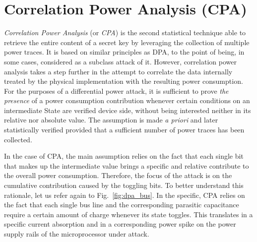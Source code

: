             \begin{table}[]
                \centering
                \caption{The secret key to used for this thesis work.}
                \label{tab:key}
            \end{table}


\newpage

    \section{Correlation Power Analysis (CPA)}\label{sec:cpa}
        \emph{Correlation Power Analysis} (or \emph{CPA}) is the second statistical technique able to retrieve the entire content of a secret key by leveraging the collection of multiple power traces. It is based on similar principles as DPA, to the point of being, in some cases, considered as a subclass attack of it. However, correlation power analysis takes a step further in the attempt to correlate the data internally treated by the physical implementation with the resulting power consumption. For the purposes of a differential power attack, it is sufficient to prove \emph{the presence} of a power consumption contribution whenever certain conditions on an intermediate State are verified device side, without being interested neither in its relative nor absolute value. The assumption is made \emph{a priori} and later statistically verified provided that a sufficient number of power traces has been collected.
        
        In the case of CPA, the main assumption relies on the fact that each single bit that makes up the intermediate value brings a specific and relative contribute to the overall power consumption. Therefore, the focus of the attack is on the cumulative contribution caused by the toggling bits. To better understand this rationale, let us refer again to Fig.~\ref{fig:dpa_bus}. In the specific, CPA relies on the fact that each single bus line and the corresponding parasitic capacitance require a certain amount of charge whenever its state toggles. This translates in a specific current absorption and in a corresponding power spike on the power supply rails of the microprocessor under attack. 

